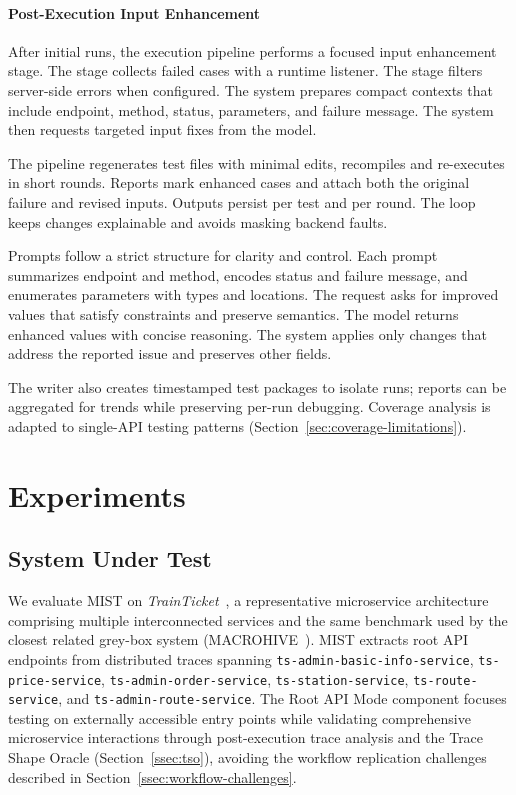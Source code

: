 \documentclass[conference]{IEEEtran}
\begin{document}
\paragraph{Post-Execution Input Enhancement}
After initial runs, the execution pipeline performs a focused input enhancement stage. The stage collects failed cases with a runtime listener. The stage filters server-side errors when configured. The system prepares compact contexts that include endpoint, method, status, parameters, and failure message. The system then requests targeted input fixes from the model.

The pipeline regenerates test files with minimal edits, recompiles and re-executes in short rounds. Reports mark enhanced cases and attach both the original failure and revised inputs. Outputs persist per test and per round. The loop keeps changes explainable and avoids masking backend faults.

Prompts follow a strict structure for clarity and control. Each prompt summarizes endpoint and method, encodes status and failure message, and enumerates parameters with types and locations. The request asks for improved values that satisfy constraints and preserve semantics. The model returns enhanced values with concise reasoning. The system applies only changes that address the reported issue and preserves other fields.

\noindent The writer also creates timestamped test packages to isolate runs; reports can be aggregated for trends while preserving per-run debugging. Coverage analysis is adapted to single-API testing patterns (Section~\ref{sec:coverage-limitations}).




\section{Experiments}\label{sec:experiments}

\subsection{System Under Test} We evaluate \textsc{MIST} on \emph{TrainTicket}~\cite{zhou2018trainticket}, a representative microservice architecture comprising multiple interconnected services and the same benchmark used by the closest related grey-box system (MACROHIVE~\cite{giamattei2022macrohive,giamattei2024macrohive}). \textsc{MIST} extracts root API endpoints from distributed traces spanning \texttt{ts-admin-basic-info-service}, \texttt{ts-price-service}, \texttt{ts-admin-order-service}, \texttt{ts-station-service}, \texttt{ts-route-service}, and \texttt{ts-admin-route-service}. The Root API Mode component focuses testing on externally accessible entry points while validating comprehensive microservice interactions through post-execution trace analysis and the Trace Shape Oracle (Section~\ref{ssec:tso}), avoiding the workflow replication challenges described in Section~\ref{ssec:workflow-challenges}.
\end{document}
